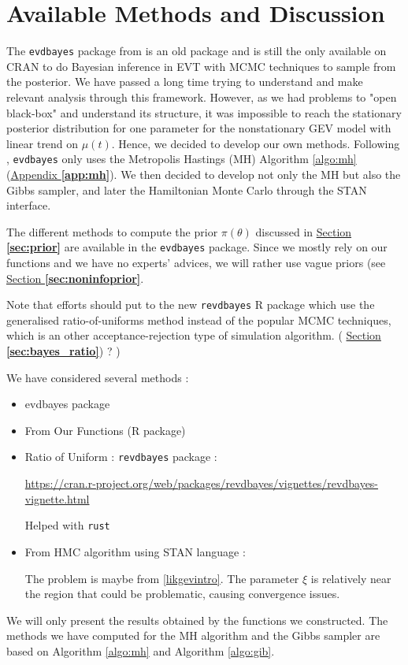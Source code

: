 \section{Available Methods and Discussion}

The \texttt{evdbayes} package from \citet{ribatet_users_2006} is an old package and is still the only available on CRAN to do Bayesian inference in EVT with MCMC techniques to sample from the posterior. We have passed a long time trying to understand and make relevant analysis through this framework. However, as we had problems to "open black-box" and understand its structure, it was impossible to reach the stationary posterior distribution for one parameter for the nonstationary GEV model with linear trend on $\mu(t)$. Hence, we decided to develop our own methods. Following \citet{hartmann_bayesian_2016}, \texttt{evdbayes} only uses the Metropolis Hastings (MH) Algorithm \ref{algo:mh} (\hyperref[app:mh]{Appendix \textbf{\ref{app:mh}}}). We then decided to develop not only the MH but also the Gibbs sampler, and later the Hamiltonian Monte Carlo through the STAN interface. 

The different methods to compute the prior $\pi(\theta)$ discussed in \hyperref[sec:prior]{Section \textbf{\ref{sec:prior}}} are available in the \texttt{evdbayes} package. Since we mostly rely on our functions and we have no experts' advices, we will rather use vague priors (see \hyperref[sec:noninfoprior]{Section \textbf{\ref{sec:noninfoprior}}}. 


 Note that efforts should put to the new \texttt{revdbayes} R package which use the generalised ratio-of-uniforms method instead of the popular MCMC techniques, which is an other acceptance-rejection type of simulation algorithm. ( \hyperref[sec:bayes_ratio]{Section \textbf{\ref{sec:bayes_ratio}}}) ? )
 
 
 
 We have considered several methods : 
 
 \begin{itemize}
 	\item evdbayes package
 	\item From Our Functions (R package)
 	\item Ratio of Uniform : \texttt{revdbayes} package :
 	
 	\url{https://cran.r-project.org/web/packages/revdbayes/vignettes/revdbayes-vignette.html}
 	
 	Helped with \texttt{rust}
 	
 	\item From HMC algorithm using STAN language :
 	
 	The problem is maybe from \ref{likgevintro}. The parameter $\xi$ is relatively near the region that could be problematic, causing convergence issues. 
 	
 \end{itemize}
We will only present the results obtained by the functions we constructed. The methods we have computed for the MH algorithm and the Gibbs sampler are based on Algorithm \ref{algo:mh} and Algorithm \ref{algo:gib}.

